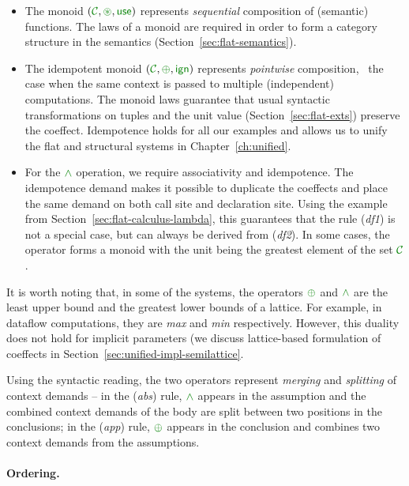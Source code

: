 \begin{itemize}
\item The monoid $(\C, \cseq, \cunit)$ represents \emph{sequential} composition of (semantic)
functions. The laws of a monoid are required in order to form a category structure in the
semantics (Section~\ref{sec:flat-semantics}).

\item The idempotent monoid $(\C, \cpar, \czero)$ represents \emph{pointwise} composition,
\ie~the case when the same context is passed to multiple (independent) computations. The monoid
laws guarantee that usual syntactic transformations on tuples and the unit value
(Section~\ref{sec:flat-exts}) preserve the coeffect. Idempotence holds for all our examples
and allows us to unify the flat and structural systems in Chapter~\ref{ch:unified}.

\item For the $\czip$ operation, we require associativity and idempotence. The idempotence
demand makes it possible to duplicate the coeffects and place the same demand on both
call site and declaration site. Using the example from Section~\ref{sec:flat-calculus-lambda},
this guarantees that the rule (\emph{df1}) is not a special case, but can always be derived
from (\emph{df2}). In some cases, the operator forms a monoid with the unit being the greatest
element of the set $\C$.
\end{itemize}

\noindent
It is worth noting that, in some of the systems, the operators $\cpar$ and $\czip$ are the least
upper bound and the greatest lower bounds of a lattice. For example, in dataflow computations, they
are \emph{max} and \emph{min} respectively. However, this duality does not hold for implicit parameters
(we discuss lattice-based formulation of coeffects in Section~\ref{sec:unified-impl-semilattice}.

Using the syntactic reading, the two operators represent \emph{merging} and \emph{splitting} of context
demands -- in the (\emph{abs}) rule, $\czip$ appears in the assumption and the combined context
demands of the body are split between two positions in the conclusions; in the (\emph{app}) rule,
$\cpar$ appears in the conclusion and combines two context demands from the assumptions.

\paragraph{Ordering.}

